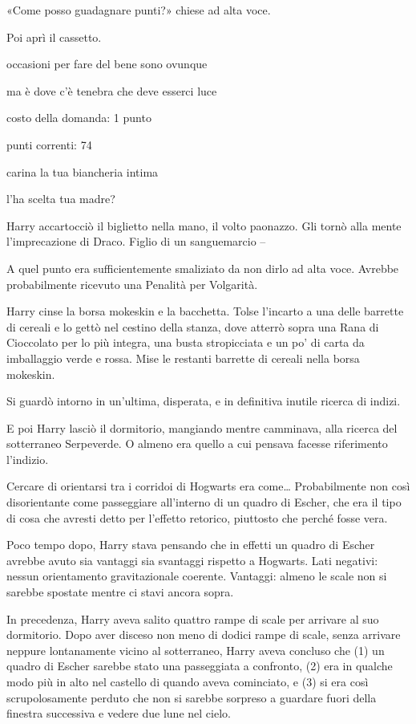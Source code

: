 «Come posso guadagnare punti?» chiese ad alta voce.

Poi aprì il cassetto.

occasioni per fare del bene sono ovunque

ma è dove c’è tenebra che deve esserci luce

costo della domanda: 1 punto

punti correnti: 74

carina la tua biancheria intima

l’ha scelta tua madre?

Harry accartocciò il biglietto nella mano, il volto paonazzo. Gli tornò alla mente l’imprecazione di Draco. Figlio di un sanguemarcio –

A quel punto era sufficientemente smaliziato da non dirlo ad alta voce. Avrebbe probabilmente ricevuto una Penalità per Volgarità.

Harry cinse la borsa mokeskin e la bacchetta. Tolse l’incarto a una delle barrette di cereali e lo gettò nel cestino della stanza, dove atterrò sopra una Rana di Cioccolato per lo più integra, una busta stropicciata e un po’ di carta da imballaggio verde e rossa. Mise le restanti barrette di cereali nella borsa mokeskin.

Si guardò intorno in un’ultima, disperata, e in definitiva inutile ricerca di indizi.

E poi Harry lasciò il dormitorio, mangiando mentre camminava, alla ricerca del sotterraneo Serpeverde. O almeno era quello a cui pensava facesse riferimento l’indizio.

Cercare di orientarsi tra i corridoi di Hogwarts era come… Probabilmente non così disorientante come passeggiare all’interno di un quadro di Escher, che era il tipo di cosa che avresti detto per l’effetto retorico, piuttosto che perché fosse vera.

Poco tempo dopo, Harry stava pensando che in effetti un quadro di Escher avrebbe avuto sia vantaggi sia svantaggi rispetto a Hogwarts. Lati negativi: nessun orientamento gravitazionale coerente. Vantaggi: almeno le scale non si sarebbe spostate mentre ci stavi ancora sopra.

In precedenza, Harry aveva salito quattro rampe di scale per arrivare al suo dormitorio. Dopo aver disceso non meno di dodici rampe di scale, senza arrivare neppure lontanamente vicino al sotterraneo, Harry aveva concluso che (1) un quadro di Escher sarebbe stato una passeggiata a confronto, (2) era in qualche modo più in alto nel castello di quando aveva cominciato, e (3) si era così scrupolosamente perduto che non si sarebbe sorpreso a guardare fuori della finestra successiva e vedere due lune nel cielo.


